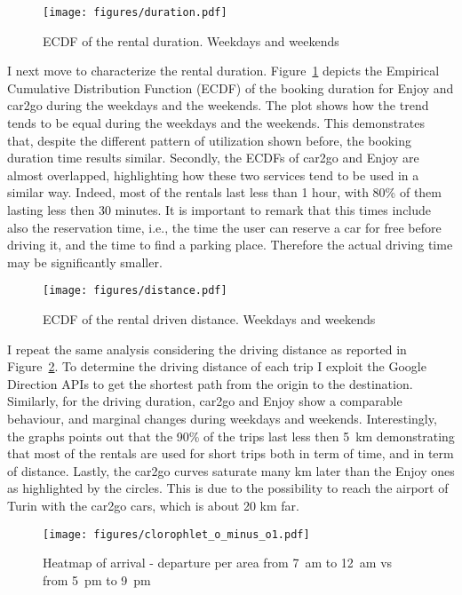 \begin{figure}
	\centering
	\texttt{[image: figures/duration.pdf]}
	\caption{ECDF of the rental duration. Weekdays and weekends\label{fig:3_5_cdf_duration}}
\end{figure}


I next move to characterize the rental duration. Figure~\ref{fig:3_5_cdf_duration} depicts the Empirical Cumulative Distribution Function (ECDF) of the booking duration for Enjoy and car2go during the weekdays and the weekends. The plot shows how the trend tends to be equal during the weekdays and the weekends. This demonstrates that, despite the different pattern of utilization shown before, the booking duration time results similar. Secondly, the ECDFs of car2go and Enjoy are almost overlapped, highlighting how these two services tend to be used in a similar way. Indeed, most of the rentals last less than 1 hour, with 80\% of them lasting less then 30 minutes. It is important to remark that this times include also the reservation time, i.e., the time the user can reserve a car for free before driving it, and the time to find a parking place. Therefore the actual driving time may be significantly smaller.


\begin{figure}
	\centering
	\texttt{[image: figures/distance.pdf]}
	\caption{ECDF of the rental driven distance. Weekdays and weekends\label{fig:3_5_cdf_distance}}
\end{figure}


I repeat the same analysis considering the driving distance as reported in Figure~\ref{fig:3_5_cdf_distance}.
To determine the driving distance of each trip I exploit the Google Direction APIs to get the shortest path from the origin to the destination. Similarly, for the driving duration, car2go and Enjoy show a comparable behaviour, and marginal changes during weekdays and weekends. Interestingly, the graphs points out that the 90\% of the trips last less then 5~km demonstrating that most of the rentals are used for short trips both in term of time, and in term of distance. Lastly, the car2go curves saturate many km later than the Enjoy ones as highlighted by the circles. This is due to the possibility to reach the airport of Turin with the car2go cars, which is about 20 km far. 



\begin{figure}[h!]
\centering
\vspace{-10pt}
 \texttt{[image: figures/clorophlet\_o\_minus\_o1.pdf]}
 \vspace{-10pt}
 \caption{Heatmap of arrival - departure per area from 7~am to 12~am vs from 5~pm to 9~pm \label{fig:3_5_heatmap_arr_dep}}
\end{figure}


